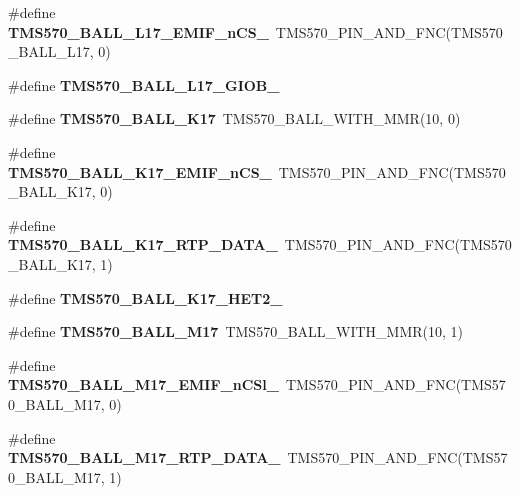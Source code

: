 \begin{DoxyCompactItemize}
\#define {\bfseries T\+M\+S570\+\_\+\+B\+A\+L\+L\+\_\+\+L17\+\_\+\+E\+M\+I\+F\+\_\+n\+C\+S\+\_}~T\+M\+S570\+\_\+\+P\+I\+N\+\_\+\+A\+N\+D\+\_\+\+F\+NC(T\+M\+S570\+\_\+\+B\+A\+L\+L\+\_\+\+L17, 0)
\item 
\#define {\bfseries T\+M\+S570\+\_\+\+B\+A\+L\+L\+\_\+\+L17\+\_\+\+G\+I\+O\+B\+\_}
\item 
\mbox{\label{tms570lc4357-pins_8h_a8a5168c62f8db42146e1974a172dcb22}} 
\#define {\bfseries T\+M\+S570\+\_\+\+B\+A\+L\+L\+\_\+\+K17}~T\+M\+S570\+\_\+\+B\+A\+L\+L\+\_\+\+W\+I\+T\+H\+\_\+\+M\+MR(10, 0)
\item 
\mbox{\label{tms570lc4357-pins_8h_a5859f43c171671b921caeda68e21cd8a}} 
\#define {\bfseries T\+M\+S570\+\_\+\+B\+A\+L\+L\+\_\+\+K17\+\_\+\+E\+M\+I\+F\+\_\+n\+C\+S\+\_}~T\+M\+S570\+\_\+\+P\+I\+N\+\_\+\+A\+N\+D\+\_\+\+F\+NC(T\+M\+S570\+\_\+\+B\+A\+L\+L\+\_\+\+K17, 0)
\item 
\mbox{\label{tms570lc4357-pins_8h_aea3ccd613930caaba2d53d24d076780f}} 
\#define {\bfseries T\+M\+S570\+\_\+\+B\+A\+L\+L\+\_\+\+K17\+\_\+\+R\+T\+P\+\_\+\+D\+A\+T\+A\+\_}~T\+M\+S570\+\_\+\+P\+I\+N\+\_\+\+A\+N\+D\+\_\+\+F\+NC(T\+M\+S570\+\_\+\+B\+A\+L\+L\+\_\+\+K17, 1)
\item 
\#define {\bfseries T\+M\+S570\+\_\+\+B\+A\+L\+L\+\_\+\+K17\+\_\+\+H\+E\+T2\+\_}
\item 
\mbox{\label{tms570lc4357-pins_8h_af53b5bb01e375989a253f6a6d44f0b61}} 
\#define {\bfseries T\+M\+S570\+\_\+\+B\+A\+L\+L\+\_\+\+M17}~T\+M\+S570\+\_\+\+B\+A\+L\+L\+\_\+\+W\+I\+T\+H\+\_\+\+M\+MR(10, 1)
\item 
\mbox{\label{tms570lc4357-pins_8h_a22e5f87d3c8f0af62cde28de93b0651e}} 
\#define {\bfseries T\+M\+S570\+\_\+\+B\+A\+L\+L\+\_\+\+M17\+\_\+\+E\+M\+I\+F\+\_\+n\+C\+Sl\+\_}~T\+M\+S570\+\_\+\+P\+I\+N\+\_\+\+A\+N\+D\+\_\+\+F\+NC(T\+M\+S570\+\_\+\+B\+A\+L\+L\+\_\+\+M17, 0)
\item 
\mbox{\label{tms570lc4357-pins_8h_a3f915c0aa745e8c9eeb78ce26ca5d6b3}} 
\#define {\bfseries T\+M\+S570\+\_\+\+B\+A\+L\+L\+\_\+\+M17\+\_\+\+R\+T\+P\+\_\+\+D\+A\+T\+A\+\_}~T\+M\+S570\+\_\+\+P\+I\+N\+\_\+\+A\+N\+D\+\_\+\+F\+NC(T\+M\+S570\+\_\+\+B\+A\+L\+L\+\_\+\+M17, 1)

\end{DoxyCompactItemize}
